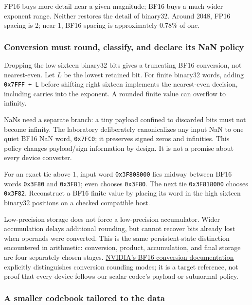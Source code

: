 FP16 buys more detail near a given magnitude; BF16 buys a much wider exponent range. Neither restores the detail of binary32. Around 2048, FP16 spacing is 2; near 1, BF16 spacing is approximately 0.78\% of one.

\subsubsection{Conversion must round, classify, and declare its NaN policy}\label{05-engine-i-ch001-conversion-must-round-classify-and-declare-its-nan-policy}

Dropping the low sixteen binary32 bits gives a truncating BF16 conversion, not nearest-even. Let \(L\) be the lowest retained bit. For finite binary32 words, adding \texttt{0x7FFF\ +\ L} before shifting right sixteen implements the nearest-even decision, including carries into the exponent. A rounded finite value can overflow to infinity.

NaNs need a separate branch: a tiny payload confined to discarded bits must not become infinity. The laboratory deliberately canonicalizes any input NaN to one quiet BF16 NaN word, \texttt{0x7FC0}; it preserves signed zeros and infinities. This policy changes payload/sign information by design. It is not a promise about every device converter.

For an exact tie above 1, input word \texttt{0x3F808000} lies midway between BF16 words \texttt{0x3F80} and \texttt{0x3F81}; even chooses \texttt{0x3F80}. The next tie \texttt{0x3F818000} chooses \texttt{0x3F82}. Reconstruct a BF16 finite value by placing its word in the high sixteen binary32 positions on a checked compatible host.

Low-precision storage does not force a low-precision accumulator. Wider accumulation delays additional rounding, but cannot recover bits already lost when operands were converted. This is the same persistent-state distinction encountered in arithmetic: conversion, product, accumulation, and final storage are four separately chosen stages. \href{https://docs.nvidia.com/cuda/cuda-math-api/cuda_math_api/group__CUDA__MATH____BFLOAT16__MISC.html}{NVIDIA's BF16 conversion documentation} explicitly distinguishes conversion rounding modes; it is a target reference, not proof that every device follows our scalar codec's payload or subnormal policy.

\subsubsection{A smaller codebook tailored to the data}\label{05-engine-i-ch001-a-smaller-codebook-tailored-to-the-data}

